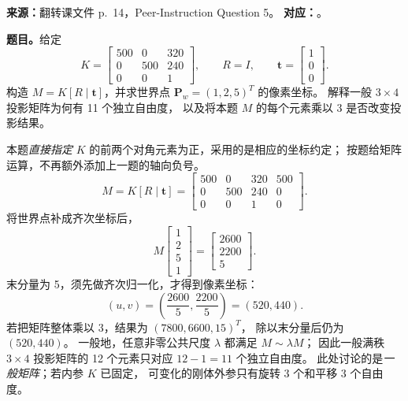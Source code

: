 \nopagebreak[4]

\textbf{来源：}翻转课文件 p.~14，Peer-Instruction Question 5。
\textbf{对应：}。

\textbf{题目。}给定
\[
  K=\begin{bmatrix}500&0&320\\0&500&240\\0&0&1\end{bmatrix},
  \qquad R=I,\qquad
  \bm t=\begin{bmatrix}1\\0\\0\end{bmatrix}.
\]
构造 $M=K[R\mid\bm t]$，并求世界点 $\bm P_w=(1,2,5)^T$ 的像素坐标。
解释一般 $3\times4$ 投影矩阵为何有 11 个独立自由度，
以及将本题 $M$ 的每个元素乘以 3 是否改变投影结果。

\begin{checkedsolution}
本题\emph{直接指定} $K$ 的前两个对角元素为正，采用的是相应的坐标约定；
按题给矩阵运算，不再额外添加上一题的轴向负号。
\[
  M=K[R\mid\bm t]
   =\boxed{\begin{bmatrix}
       500&0&320&500\\
       0&500&240&0\\
       0&0&1&0
     \end{bmatrix}}.
\]
将世界点补成齐次坐标后，
\[
  M\begin{bmatrix}1\\2\\5\\1\end{bmatrix}
   =\begin{bmatrix}2600\\2200\\5\end{bmatrix}.
\]
末分量为 5，须先做齐次归一化，才得到像素坐标：
\[
  \boxed{(u,v)=\left(\frac{2600}{5},\frac{2200}{5}\right)=(520,440)}.
\]
若把矩阵整体乘以 3，结果为 $(7800,6600,15)^T$，
除以末分量后仍为 $(520,440)$。
一般地，任意非零公共尺度 $\lambda$ 都满足 $M\sim\lambda M$；
因此一般满秩 $3\times4$ 投影矩阵的 12 个元素只对应
$12-1=\boxed{11}$ 个独立自由度。
此处讨论的是\emph{一般矩阵}；若内参 $K$ 已固定，
可变化的刚体外参只有旋转 3 个和平移 3 个自由度。
\end{checkedsolution}
